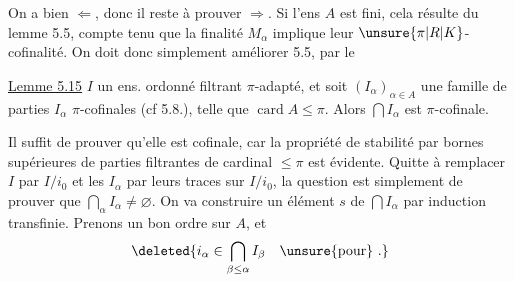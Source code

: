  On a bien  $\Longleftarrow$, donc il reste à prouver $\Longrightarrow$. Si l'ens  $A$ est fini, cela résulte du lemme 5.5, compte tenu que la finalité  $M_\alpha$ implique leur $\unsure{\pi|R|K}$-cofinalité. On doit donc simplement améliorer 5.5, par le

\uline{Lemme 5.15}   $I$ un ens. ordonné filtrant $\pi$-adapté, et soit $(I_\alpha)_{\alpha\in A}$ une famille de parties $I_\alpha$ $\pi$-cofinales (cf 5.8.), telle que $\operatorname{card} A\leq\pi$. Alors $\bigcap I_\alpha$ est $\pi$-cofinale.

Il suffit de prouver qu'elle est cofinale, car la propriété de stabilité par bornes supérieures de parties filtrantes de cardinal $\leq\pi$ est évidente. Quitte à remplacer $I$ par $I/i_0$ et les $I_\alpha$ par leurs traces sur $I/i_0$, la question est simplement de prouver que $\bigcap_\alpha I_\alpha\ne\varnothing$. On va construire un élément $s$ de $\bigcap I_\alpha$ par induction transfinie. Prenons un bon ordre sur $A$, et   
\[
 \deleted{i_\alpha\in\bigcap_{\beta\leq\alpha}I_\beta\quad\unsure{\text{pour}}\ .}
\]

